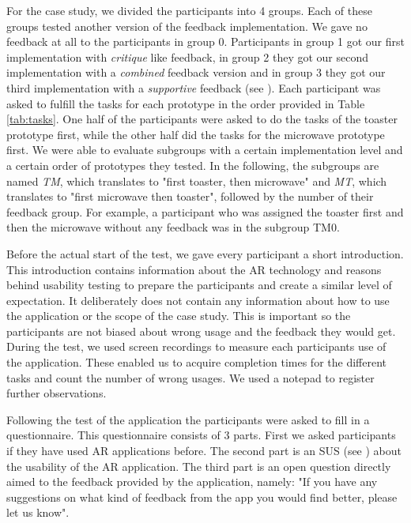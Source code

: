 \documentclass[11pt, a4paper]{article}
\begin{document}
			For the case study, we divided the participants into 4 groups. Each of these groups tested another version of the feedback implementation. We gave no feedback at all to the participants in group 0. Participants in group 1 got our first implementation with \emph{critique} like feedback, in group 2 they got our second implementation with a \emph{combined} feedback version and in group 3 they got our third implementation with a \emph{supportive} feedback (see ). Each participant was asked to fulfill the tasks for each prototype in the order provided in Table \ref{tab:tasks}. One half of the participants were asked to do the tasks of the toaster prototype first, while the other half did the tasks for the microwave prototype first. We were able to evaluate subgroups with a certain implementation level and a certain order of prototypes they tested. In the following, the subgroups are named \emph{TM}, which translates to "first toaster, then microwave" and \emph{MT}, which translates to "first microwave then toaster", followed by the number of their feedback group. For example, a participant who was assigned the toaster first and then the microwave without any feedback was in the subgroup TM0.

			Before the actual start of the test, we gave every participant a short introduction. This introduction contains information about the \ac{AR} technology and reasons behind usability testing to prepare the participants and create a similar level of expectation. It deliberately does not contain any information about how to use the application or the scope of the case study. This is important so the participants are not biased about wrong usage and the feedback they would get. During the test, we used screen recordings to measure each participants use of the application. These enabled us to acquire completion times for the different tasks and count the number of wrong usages. We used a notepad to register further observations.

			Following the test of the application the participants were asked to fill in a questionnaire. This questionnaire consists of 3 parts. First we asked participants if they have used \ac{AR} applications before. The second part is an \ac{SUS} (see ) about the usability of the \ac{AR} application. The third part is an open question directly aimed to the feedback provided by the application, namely: "If you have any suggestions on what kind of feedback from the app you would find better, please let us know".
\end{document}
